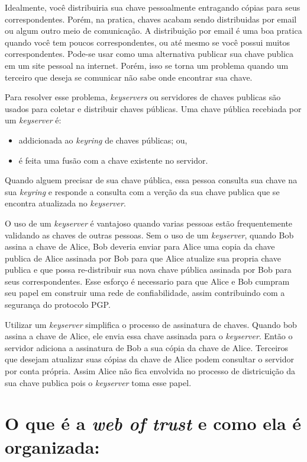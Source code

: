\documentclass[12pt, letterpaper]{article}
\begin{document}
Idealmente, você distribuiria sua chave pessoalmente entragando cópias para seus correspondentes.
Porém, na pratica, chaves acabam sendo distribuidas por email ou algum outro meio de comunicação.
A distribuição por email é uma boa pratica quando você tem poucos correspondentes, ou até mesmo
se você possui muitos correspondentes. Pode-se usar como uma alternativa publicar sua chave
publica em um site pessoal na internet. Porém, isso se torna um problema quando um terceiro que
deseja se comunicar não sabe onde encontrar sua chave.

Para resolver esse problema, \textit{keyservers} ou servidores de chaves publicas são
usados para coletar e distribuir chaves públicas.
Uma chave pública recebiada por um \textit{keyserver} é:
\begin{itemize}
  \item addicionada ao \textit{keyring} de chaves públicas; ou,
  \item é feita uma fusão com a chave existente no servidor.
\end{itemize}
Quando alguem precisar de sua chave pública, essa pessoa consulta sua chave na sua \textit{keyring}
e responde a consulta com a verção da sua chave publica que se encontra atualizada no \textit{keyserver}.

O uso de um \textit{keyserver} é vantajoso quando varias pessoas estão frequentemente validando
as chaves de outras pessoas. Sem o uso de um \textit{keyserver}, quando Bob assina a chave de Alice,
Bob deveria enviar para Alice uma copia da chave publica de Alice assinada por Bob para que Alice
atualize sua propria chave publica e que possa re-distribuir sua nova chave pública assinada por Bob
para seus correspondentes. Esse esforço é necessario para que Alice e Bob cumpram seu papel em construir
uma rede de confiabilidade, assim contribuindo com a segurança do protocolo PGP\@.

Utilizar um \textit{keyserver} simplifica o processo de assinatura de chaves.
Quando bob assina a chave de Alice, ele envia essa chave assinada para o \textit{keyserver}.
Então o servidor adiciona a assinatura de Bob a sua cópia da chave de Alice.
Terceiros que desejam atualizar suas cópias da chave de Alice podem consultar o servidor
por conta própria. Assim Alice não fica envolvida no processo de districuição da sua chave publica
pois o \textit{keyserver} toma esse papel.

\section{O que é a \textit{web of trust} e como ela é organizada:}\label{weboftrust}
\end{document}

